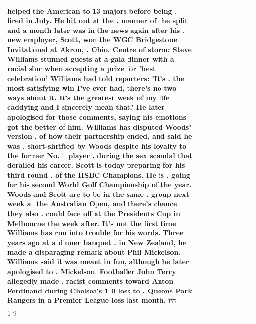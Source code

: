 \begin{table}[H]
\begin{tabular}{lllrlllll}
helped the American to 13 majors before being . fired in July. He hit out at the . manner of the split and a month later was in the news again after his . new employer, Scott, won the WGC Bridgestone Invitational at Akron, . Ohio. Centre of storm: Steve Williams stunned guests at a gala dinner with a racial slur when accepting a prize for 'best celebration' Williams had told reporters: 'It's . the most satisfying win I've ever had, there's no two ways about it. It's the greatest week of my life caddying and I sincerely mean that.' He later apologised for those comments, saying his emotions got the better of him. Williams has disputed Woods' version . of how their partnership ended, and said he was . short-shrifted by Woods despite his loyalty to the former No. 1 player . during the sex scandal that derailed his career. Scott is today preparing for his third round . of the HSBC Champions. He is . going for his second World Golf Championship of the year. Woods and Scott are to be in the same . group next week at the Australian Open, and there's chance they also . could face off at the Presidents Cup in Melbourne the week after. It's not the first time Williams has run into trouble for his words. Three years ago at a dinner banquet . in New Zealand, he made a disparaging remark about Phil Mickelson. Williams said it was meant in fun, although he later apologised to . Mickelson. Footballer John Terry allegedly made . racist comments toward Anton Ferdinand during Chelsea's 1-0 loss to . Queens Park Rangers in a Premier League loss last month. היו \\
\cline{1-9}

\end{tabular}
\end{table}
